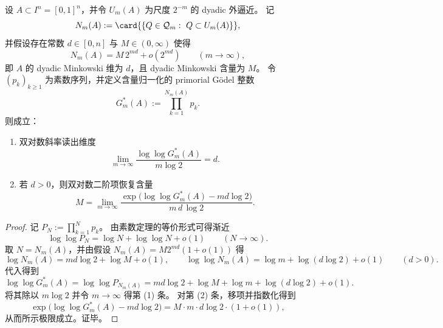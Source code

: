 
\begin{theorem}\label{thm:spg-godel-doublelog-second-order-minkowski-content}
设 \(A\subset I^n=[0,1]^n\)，并令 \(U_m(A)\) 为尺度 \(2^{-m}\) 的 dyadic 外逼近。
记
\[
N_m(A):=\card{\{Q\in\mathcal Q_m:\ Q\subset U_m(A)\}},
\]
并假设存在常数 \(d\in[0,n]\) 与 \(M\in(0,\infty)\) 使得
\[
N_m(A)=M\,2^{md}+o(2^{md})\qquad(m\to\infty),
\]
即 \(A\) 的 dyadic Minkowski 维为 \(d\)，且 dyadic Minkowski 含量为 \(M\)。
令 \((p_k)_{k\ge 1}\) 为素数序列，并定义含量归一化的 primorial Gödel 整数
\[
G_m^\ast(A):=\prod_{k=1}^{N_m(A)} p_k.
\]
则成立：
\begin{enumerate}
  \item 双对数斜率读出维度
  \[
  \lim_{m\to\infty}\frac{\log\log G_m^\ast(A)}{m\log 2}=d.
  \]
  \item 若 \(d>0\)，则双对数二阶项恢复含量
  \[
  M=\lim_{m\to\infty}\frac{\exp\!\bigl(\log\log G_m^\ast(A)-md\log 2\bigr)}{m\,d\,\log 2}.
  \]
\end{enumerate}
\end{theorem}
\begin{proof}
记 \(P_N:=\prod_{k=1}^{N}p_k\)。
由素数定理的等价形式可得渐近
\[
\log\log P_N=\log N+\log\log N+o(1)\qquad(N\to\infty).
\]
取 \(N=N_m(A)\)，并由假设 \(N_m(A)=M2^{md}(1+o(1))\) 得
\[
\log N_m(A)=md\log 2+\log M+o(1),
\qquad
\log\log N_m(A)=\log m+\log(d\log 2)+o(1)\qquad(d>0).
\]
代入得到
\[
\log\log G_m^\ast(A)
=\log\log P_{N_m(A)}
=md\log 2+\log M+\log m+\log(d\log 2)+o(1).
\]
将其除以 \(m\log 2\) 并令 \(m\to\infty\) 得第 (1) 条。
对第 (2) 条，移项并指数化得到
\[
\exp\!\bigl(\log\log G_m^\ast(A)-md\log 2\bigr)
=M\cdot m\cdot d\log 2\cdot (1+o(1)),
\]
从而所示极限成立。证毕。
\end{proof}

\endinput

